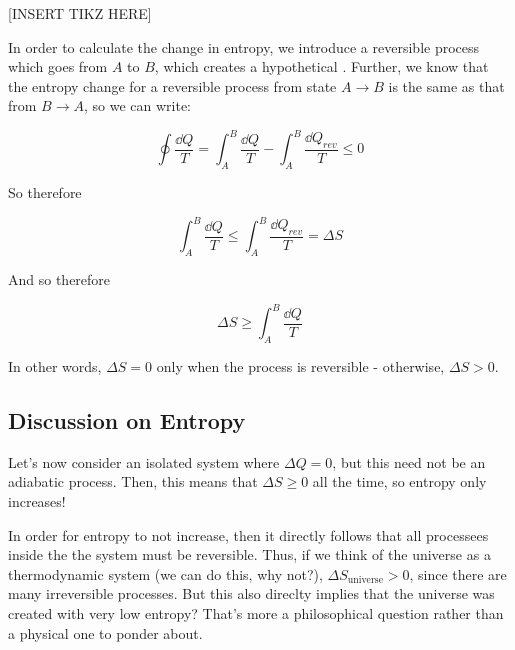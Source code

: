     [INSERT TIKZ HERE]

    In order to calculate the change in entropy, we introduce a reversible process which goes from $A$ to $B$, which creates a hypothetical . Further, we know that the entropy change for a reversible process from state $A \to B$ is the same as that from $B \to A$, so we can write: 

    \[ \oint \frac{\dd Q}{T} = \int_A^B \frac{\dd Q}{T} - \int_{A}^B \frac{\dd Q_{rev}}{T} \le 0 \]

    So therefore

    \[ \int_A^B \frac{\dd Q}{T} \le \int_A^B \frac{\dd Q_{rev}}{T} = \Delta S\]

    And so therefore 

    \[ \Delta S \ge \int_A^B \frac{\dd Q}{T}\]

    In other words, $\Delta S = 0$ only when the process is reversible - otherwise, $\Delta S > 0$.

    \subsection{Discussion on Entropy}

    Let's now consider an isolated system where $\Delta Q = 0$, but this need not be an adiabatic process. Then, this means that $\Delta S \ge 0$ all the time, so entropy only increases!

    In order for entropy to not increase, then it directly follows that all processees inside the the system must be reversible. Thus, if we think of the universe as a thermodynamic system (we can do this, why not?), $\Delta S_{\text{universe}} > 0$, since there are many irreversible processes. But this also direclty implies that the universe was created with very low entropy? That's more a philosophical question rather than a physical one to ponder about.